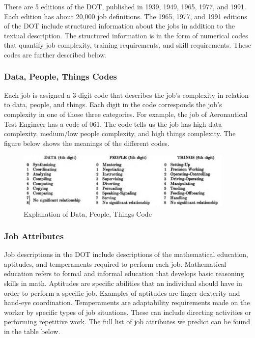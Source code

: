 \documentclass[11pt]{article}
\begin{document}
  There are 5 editions of the DOT, published in 1939, 1949, 1965, 1977, and 1991. Each edition has about 20,000 job definitions. The 1965, 1977, and 1991 editions of the DOT include structured information about the jobs in addition to the textual description. The structured information is in the form of numerical codes that quantify job complexity, training requirements, and skill requirements. These codes are further described below.

  \subsubsection*{Data, People, Things Codes}
  Each job is assigned a 3-digit code that describes the job's complexity in relation to data, people, and things. Each digit in the code corresponds the job's complexity in one of those three categories. For example, the job of Aeronautical Test Engineer has a code of 061. The code tells us the job has high data complexity, medium/low people complexity, and high things complexity. The figure below shows the meanings of the different codes.

      \begin{figure}[h]
        \centering
        \caption{Explanation of Data, People, Things Code}
        \includegraphics[width=0.95\textwidth, keepaspectratio=true]{images/DPT}
      \end{figure}

  \subsubsection*{Job Attributes}
  Job descriptions in the DOT include descriptions of the mathematical education, aptitudes, and temperaments required to perform each job. Mathematical education refers to formal and informal education that develops basic reasoning skills in math. Aptitudes are specific abilities that an individual should have in order to perform a specific job. Examples of aptitudes are finger dexterity and hand-eye coordination. Temperaments are adaptability requirements made on the worker by specific types of job situations. These can include directing activities or performing repetitive work. The full list of job attributes we predict can be found in the table below.
\end{document}
